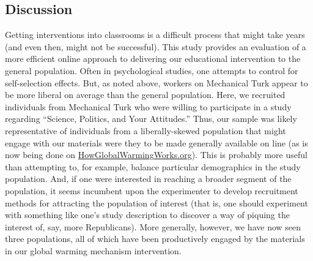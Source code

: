 \subsection{Discussion}

Getting interventions into classrooms is a difficult process that might take
years (and even then, might not be successful). This study provides an
evaluation of a more efficient online approach to delivering our educational
intervention to the general population. Often in psychological studies, one
attempts to control for self-selection effects. But, as noted above, workers on
Mechanical Turk appear to be more liberal on average than the general
population. Here, we recruited individuals from Mechanical Turk who were willing
to participate in a study regarding “Science, Politics, and Your Attitudes.”
Thus, our sample was likely representative of individuals from a
liberally-skewed population that might engage with our materials were they to be
made generally available on line (as is now being done on
\url{HowGlobalWarmingWorks.org}). This is probably more useful than attempting
to, for example, balance particular demographics in the study population. And,
if one were interested in reaching a broader segment of the population, it seems
incumbent upon the experimenter to develop recruitment methods for attracting
the population of interest (that is, one should experiment with something like
one's study description to discover a way of piquing the interest of, say, more
Republicans).  More generally, however, we have now seen three populations, all
of which have been productively engaged by the materials in our global warming
mechanism intervention.

